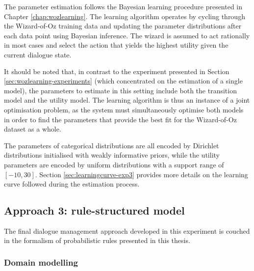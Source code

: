 The parameter estimation follows the Bayesian learning procedure presented in Chapter \ref{chap:wozlearning}. The learning algorithm operates by cycling through the Wizard-of-Oz training data and updating the parameter distributions after each data point using Bayesian inference.  The wizard is assumed to act rationally in most cases and select the action that yields the highest utility given the current dialogue state. 

It should be noted that, in contrast to the experiment presented in Section \ref{sec:wozlearning-experiments} (which concentrated on the estimation of a single model), the parameters to estimate in this setting include both the transition model and the utility model.  The learning algorithm is thus an instance of a joint optimisation problem, as the system must simultaneously optimise both models in order to find the parameters that provide the best fit for the Wizard-of-Oz dataset as a whole. 

The parameters of categorical distributions are all encoded by Dirichlet distributions initialised with weakly informative priors, while the utility parameters are encoded by uniform distributions with a support range of $[-10, 30]$.  Section \ref{sec:learningcurve-exp3} provides more details on the learning curve followed during the estimation process.

\subsection{Approach 3: rule-structured model}

The final dialogue management approach developed in this experiment is couched in the formalism of probabilistic rules presented in this thesis.  


\subsubsection*{Domain modelling}

